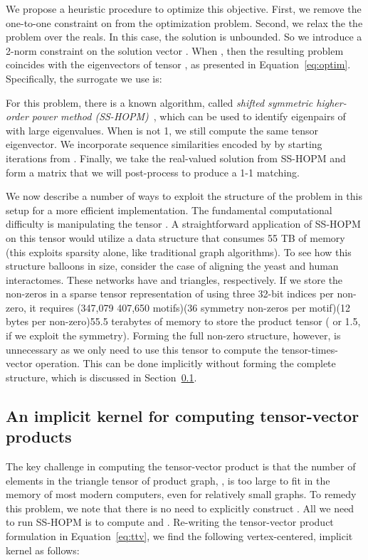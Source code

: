 \documentclass[10pt, journal, compsoc, final]{IEEEtran}
\begin{document}
We propose a heuristic procedure to optimize this objective. 
First, we remove the one-to-one constraint on  from the
optimization problem. Second, we relax the the problem over the reals. In this case, the solution is unbounded. So we introduce a 2-norm constraint on the solution vector . When , then the resulting problem coincides with the 
eigenvectors of tensor , as presented in 
Equation~\ref{eq:optim}.  Specifically, the surrogate we use is:

For this problem, there is a known algorithm, called \textit{shifted 
symmetric higher-order power method (SS-HOPM)}~\cite{SSHOPM}, which can be used to identify eigenpairs of 
 with large eigenvalues. 
When  is not 1, we still compute the same tensor eigenvector.
We incorporate sequence similarities 
encoded by  by starting iterations from .
Finally,
we take the real-valued solution from SS-HOPM and form a matrix 
 that we will post-process to produce a 1-1 matching.

We now describe a number
of ways to exploit the structure of the problem in this setup for a more efficient implementation. The fundamental computational difficulty is manipulating the tensor
. A straightforward
application of SS-HOPM on this tensor would utilize a data structure that consumes
55 TB of memory (this exploits sparsity alone, like traditional graph algorithms). 
To see how this structure balloons in size, consider the case of aligning the yeast and 
human interactomes. These networks have  and  triangles, respectively.
If we store the non-zeros in a sparse tensor representation of  using three 32-bit
indices per non-zero, it requires (347,079 407,650 motifs)(36 symmetry non-zeros per motif)(12 bytes per non-zero)55.5 terabytes of memory to store the product tensor ( or 1.5, if we exploit the symmetry).
Forming the full non-zero structure, however, is unnecessary as we only need to use this tensor
to compute the tensor-times-vector operation. This can be done implicitly without
forming the complete structure, which is discussed in Section~\ref{sec:impTTV}.

\subsection{An implicit kernel for computing tensor-vector products}
\label{sec:impTTV}

The key challenge in computing the tensor-vector product is that the number of elements in the triangle tensor of product graph, , is too large to fit in the memory of most modern computers, even for relatively small graphs. To remedy this problem, we note that there is no need to explicitly construct . All we need to run SS-HOPM is to compute  and . Re-writing the tensor-vector product formulation in Equation~\ref{eq:ttv}, we find the following vertex-centered, implicit kernel as follows:
\end{document}
